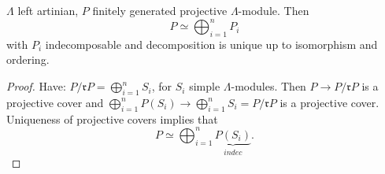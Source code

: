 \begin{prop}\label{prop:40}
  $\Lambda$ left artinian, $P$ finitely generated projective
  $\Lambda$-module. Then \[P \simeq \bigoplus_{i=1}^n P_i\] with $P_i$
  indecomposable and decomposition is unique up to isomorphism and
  ordering.
\end{prop}
\begin{proof}
  Have: $P / \mathfrak{r}P = \bigoplus_{i=1}^n S_i$, for $S_i$ simple
  $\Lambda$-modules.  Then $P \to P/\mathfrak{r}P$ is a projective
  cover and $\bigoplus_{i=1}^n P(S_i) \to \bigoplus_{i=1}^n S_i = P /
  \mathfrak{r}P$ is a projective cover.  Uniqueness of projective
  covers implies that 
  \[P \simeq \bigoplus_{i=1}^n \underbrace{P(S_i)}_{indec}.\]
\end{proof}

